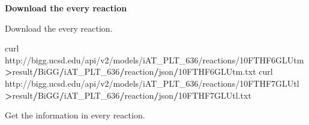 \documentclass[
]{book}
\newenvironment{Shaded}{\begin{snugshade}}{\end{snugshade}}
\newcommand{\AttributeTok}[1]{\textcolor[rgb]{0.13,0.29,0.53}{#1}}
\newcommand{\DecValTok}[1]{\textcolor[rgb]{0.00,0.00,0.81}{#1}}
\newcommand{\FunctionTok}[1]{\textcolor[rgb]{0.13,0.29,0.53}{\textbf{#1}}}
\newcommand{\NormalTok}[1]{#1}
\newcommand{\OtherTok}[1]{\textcolor[rgb]{0.56,0.35,0.01}{#1}}
\newcommand{\SpecialCharTok}[1]{\textcolor[rgb]{0.81,0.36,0.00}{\textbf{#1}}}
\newcommand{\StringTok}[1]{\textcolor[rgb]{0.31,0.60,0.02}{#1}}
\begin{document}
\begin{Shaded}
\end{Shaded}

\textbf{Download the every reaction}

Download the every reaction.

\begin{Shaded}
\begin{Highlighting}[]
\NormalTok{curl }\StringTok{\textquotesingle{}http://bigg.ucsd.edu/api/v2/models/iAT\_PLT\_636/reactions/10FTHF6GLUtm\textquotesingle{}}    \SpecialCharTok{\textgreater{}}\NormalTok{result}\SpecialCharTok{/}\NormalTok{BiGG}\SpecialCharTok{/}\NormalTok{iAT\_PLT\_636}\SpecialCharTok{/}\NormalTok{reaction}\SpecialCharTok{/}\NormalTok{json}\SpecialCharTok{/}\DecValTok{10}\NormalTok{FTHF6GLUtm.txt}
\NormalTok{curl }\StringTok{\textquotesingle{}http://bigg.ucsd.edu/api/v2/models/iAT\_PLT\_636/reactions/10FTHF7GLUtl\textquotesingle{}}    \SpecialCharTok{\textgreater{}}\NormalTok{result}\SpecialCharTok{/}\NormalTok{BiGG}\SpecialCharTok{/}\NormalTok{iAT\_PLT\_636}\SpecialCharTok{/}\NormalTok{reaction}\SpecialCharTok{/}\NormalTok{json}\SpecialCharTok{/}\DecValTok{10}\NormalTok{FTHF7GLUtl.txt}
\end{Highlighting}
\end{Shaded}

Get the information in every reaction.
\end{document}
